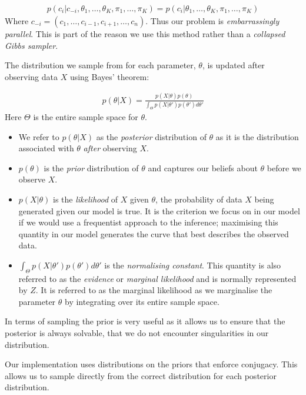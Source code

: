 \documentclass[11pt]{article} %
\begin{document}
\begin{align}
p(c_i|c_{-i}, \theta_1,\ldots,\theta_K, \pi_1,\ldots,\pi_K) = p(c_i| \theta_1,\ldots,\theta_K, \pi_1,\ldots,\pi_K)
\end{align}
Where $c_{-i} = (c_1, \ldots, c_{i-1}, c_{i+1}, \ldots, c_n)$. Thus our problem is \emph{embarrassingly parallel}. This is part of the reason we use this method rather than a \emph{collapsed Gibbs sampler}.

The distribution we sample from for each parameter, $\theta$, is updated after observing data $X$ using Bayes' theorem:

\begin{align} \label{Bayes_theorem}
p(\theta | X) = \frac{p(X | \theta) p(\theta)}{\int_\Theta p(X | \theta ') p(\theta ') d \theta '}
\end{align}
Here $\Theta$ is the entire sample space for $\theta$. 
\begin{itemize}
 \item We refer to $p(\theta | X)$ as the \emph{posterior} distribution of $\theta$ as it is the distribution associated with $\theta$ \emph{after} observing $X$.
 \item $p(\theta)$ is the \emph{prior} distribution of $\theta$ and captures our beliefs about $\theta$ before we observe $X$.
 \item $p(X | \theta)$ is the \emph{likelihood} of $X$ given $\theta$, the probability of data $X$ being generated given our model is true. It is the criterion we focus on in our model if we would use a frequentist approach to the inference; maximising this quantity in our model generates the curve that best describes the observed data. 
 \item $\int_\Theta p(X | \theta ') p(\theta ') d \theta '$ is the \emph{normalising constant}. This quantity is also referred to as the \emph{evidence} \cite{MacKayInformationTheoryInference2003} or \emph{marginal likelihood} and is normally represented by $Z$. It is referred to as the marginal likelihood as we marginalise the parameter $\theta$ by integrating over its entire sample space.
\end{itemize}

In terms of sampling the prior is very useful as it allows us to ensure that the posterior is always solvable, that we do not encounter singularities in our distribution.

Our implementation uses distributions on the priors that enforce conjugacy. This allows us to sample directly from the correct distribution for each posterior distribution.
\end{document}
